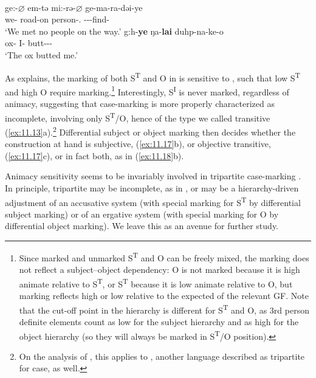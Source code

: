 \documentclass[output=paper]{langsci/langscibook}
\begin{document}
\ea%
    \label{ex:11.18} \\
	\ea
		\gll ge:-\textbf{${\varnothing}$}    em-tə    mi:-rə-\textbf{${\varnothing}$}      ge-ma-ra-dəi-ye\\
			we-\Nom{}  road-on  person-\Pl.\Abs{} \Fpl-\Neg-\Tpl{}-find-\Ipfv{}\\
		\glt ‘We met no people on the way.’
	\ex
		\gll g:h-\textbf{ye}  ŋa-\textbf{lai}  duhp-na-ke-o\\
			ox-\Erg{}    I-\Acc{}  butt-\Fsg-\Pfv-\Tsg{}\\
		\glt ‘The ox butted me.’
	\z
\z

As \citet[69]{Watters2002} explains, the marking of both S\textsuperscript{T}
and O in  is sensitive to , such that low 
S\textsuperscript{T} and high  O require marking.\footnote{Since marked
and unmarked S\textsuperscript{T} and O can be freely mixed, the marking does
not reflect a subject--object dependency: O is not marked because it is high
animate relative to S\textsuperscript{T}, or S\textsuperscript{T} because it is
low animate relative to O, but marking reflects high or low  relative to
the expected  of the relevant \gls{GF}. Note that the cut-off point
in the  hierarchy is different for S\textsuperscript{T} and O, as 3rd
person definite elements count as low for the subject hierarchy and as high for
the object hierarchy (so they will always be marked in S\textsuperscript{T}/O
position).} Interestingly, S\textsuperscript{I} is never marked, regardless of
animacy, suggesting that  case-marking is more properly characterized
as incomplete, involving only S\textsuperscript{T}/O, hence of the type we
called transitive (\ref{ex:11.13}a).\footnote{On the analysis of
\citet{Lindenbergh2015}, this applies to , another language
described as tripartite for case, as well.} Differential subject or object
marking then decides whether the construction at hand is subjective,
(\ref{ex:11.17}b), or objective transitive, (\ref{ex:11.17}c), or in
fact both, as in (\ref{ex:11.18}b).

Animacy sensitivity seems to be invariably involved in tripartite case-marking
\citep{Zwart2006a}. In principle, tripartite  may be incomplete,
as in , or may be a hierarchy-driven adjustment of an accusative
system (with special marking for S\textsuperscript{T} by differential subject
marking) or of an ergative system (with special marking for O by differential
object marking).  We leave this as an avenue for further study.
\end{document}
